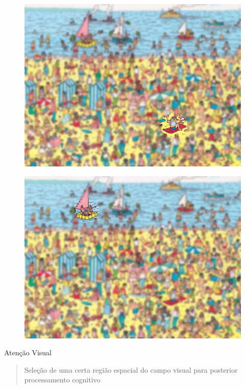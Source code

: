 \documentclass[10pt]{beamer}
\begin{document}
\begin{frame}{}
    \begin{figure}
        \centering
        \includegraphics[width=0.9\linewidth]{./img/wheres_wally_focus_1.jpg}
    \end{figure}
\end{frame}

\begin{frame}{}
    \begin{figure}
        \centering
        \includegraphics[width=0.9\linewidth]{./img/wheres_wally_focus_2.jpg}
    \end{figure}
\end{frame}

\begin{frame}{Atenção Visual}
    \begin{quote}
        Seleção de uma certa região espacial do campo visual para
        posterior processamento cognitivo
    \end{quote}
\end{frame}
\end{document}
